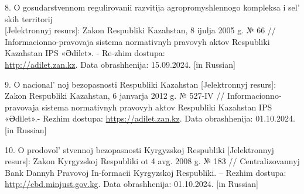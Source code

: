 \begin{references}
8. O gosudarstvennom regulirovanii razvitija agropromyshlennogo
kompleksa i sel' skih territorij \\{[}Jelektronnyj
resurs{]}: Zakon Respubliki Kazahstan, 8 ijulja 2005 g. № 66 //
Informacionno-pravovaja sistema normativnyh pravovyh aktov Respubliki
Kazahstan IPS «Әdіlet». - Re-zhim dostupa:\\
\href{http://adilet.zan.kz/rus/docs/Z050000066}{http://adilet.zan.kz}. Data obrashhenija: 15.09.2024.
{[}in Russian{]}

9. O nacional' noj bezopasnosti Respubliki Kazahstan
{[}Jelektronnyj resurs{]}: Zakon Respubliki Kazahstan, 6 janvarja 2012
g. № 527-IV // Informacionno-pravovaja sistema normativnyh pravovyh
aktov Respubliki Kazahstan IPS «Әdіlet».- Rezhim dostupa:
\href{https://adilet.zan.kz/rus/docs/Z1200000527}{https://adilet.zan.kz}. Data obrashhenija:
01.10.2024. \\{[}in Russian{]}

10. O prodovol' stvennoj bezopasnosti Kyrgyzskoj
Respubliki {[}Jelektronnyj resurs{]}: Zakon Kyrgyzskoj Respubliki ot 4
avg. 2008 g. № 183 // Centralizovannyj Bank Dannyh Pravovoj In-formacii
Kyrgyzskoj Respubliki. -- Rezhim dostupa:
\href{http://cbd.minjust.gov.kg/act/view/ru-ru/202397?cl=ru-ru}{http://cbd.minjust.gov.kg}. Data
obrashhenija: 01.10.2024. {[}in Russian{]}
\end{references}

